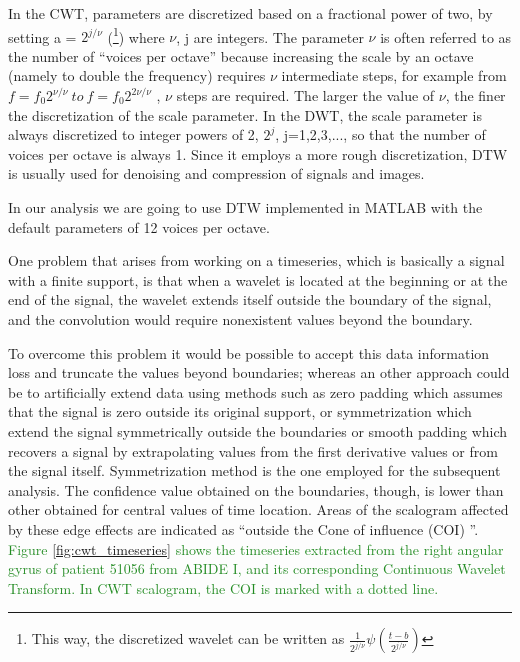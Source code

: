 \documentclass[11pt]{report}
\begin{document}
In the CWT, parameters are discretized based on a fractional power of two, by setting a = $2^{j/\nu}$  (\footnote{This way, the discretized wavelet can be written as $\frac{1}{2^{j/\nu}} \psi\left ( \frac{t-b}{2^{j/\nu}}\right )$ }) \cite{liu-1994} \cite{dabauchies-1992} where $\nu $, j are integers.
The parameter $\nu$ is often referred to as the number of “voices per octave” because increasing the scale by an octave (namely to double the frequency) requires $\nu$ intermediate steps, for example from $f = f_0 2^{\nu/\nu} \ to \ f = f_0 2^{2\nu/\nu}$ , $\nu$ steps are required.
The larger the value of $\nu$, the finer the discretization of the scale parameter.
In the DWT, the scale parameter is always discretized to integer powers of 2, $2^j$, j=1,2,3,..., so that the number of voices per octave is always 1.
Since it employs a more rough discretization, DTW is usually used for denoising and compression of signals and images.

In our analysis we are going to use DTW implemented in MATLAB with the default parameters of 12 voices per octave.


One problem that arises from working on a timeseries, which is basically a signal with a finite support, is that when a wavelet is located at the beginning or at the end of the signal, the wavelet extends itself outside the boundary of the signal, and the convolution would require nonexistent values beyond the boundary.

To overcome this problem it would be possible to accept this data information loss and truncate the values beyond boundaries; whereas an other approach could be to artificially extend data using methods such as zero padding which assumes that the signal is zero outside its original support, or symmetrization which extend the signal symmetrically outside the boundaries or smooth padding which recovers a signal by extrapolating values from the first derivative values or from the signal itself.
Symmetrization method is the one employed for the subsequent analysis.
The confidence value obtained on the boundaries, though, is lower than other obtained for central values of time location.
Areas of the scalogram affected by these edge effects are indicated as \textquotedblleft outside the Cone of influence (COI) \textquotedblright.
\textcolor{ForestGreen}{
Figure \ref{fig:cwt_timeseries} shows the timeseries extracted from the right angular gyrus of patient 51056 from ABIDE I, and its corresponding Continuous Wavelet Transform. In CWT scalogram, the COI is marked with a dotted line.
}
\end{document}
